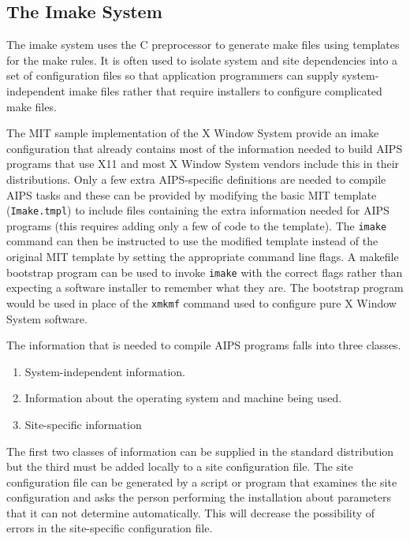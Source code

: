 \subsection{The Imake System}

The imake system uses the C preprocessor to generate make files using
templates for the make rules.  It is often used to isolate system and
site dependencies into a set of configuration files so that
application programmers can supply system-independent imake files
rather that require installers to configure complicated make files.

The MIT sample implementation of the X Window System provide an imake
configuration that already contains most of the information needed to
build AIPS programs that use X11 and most X Window System vendors
include this in their distributions.  Only a few extra AIPS-specific
definitions are needed to compile AIPS tasks and these can be provided
by modifying the basic MIT template ({\tt Imake.tmpl}) to include
files containing the extra information needed for AIPS programs (this
requires adding only a few of code to the template).  The {\tt imake}
command can then be instructed to use the modified template instead of
the original MIT template by setting the appropriate command line
flags.  A makefile bootstrap program can be used to invoke {\tt imake}
with the correct flags rather than expecting a software installer to
remember what they are.  The bootstrap program would be used in place
of the {\tt xmkmf} command used to configure pure X Window System
software.

The information that is needed to compile AIPS programs falls into
three classes.
\begin{enumerate}
\item
System-independent information.

\item
Information about the operating system and machine being used.

\item
Site-specific information
\end{enumerate}
The first two classes of information can be supplied in the standard
distribution but the third must be added locally to a site
configuration file.  The site configuration file can be generated by a
script or program that examines the site configuration and asks the
person performing the installation about parameters that it can not
determine automatically.  This will decrease the possibility of errors
in the site-specific configuration file.

